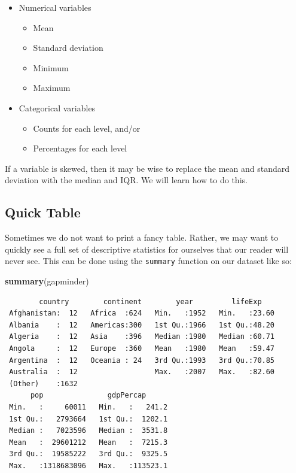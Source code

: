 \documentclass[
]{book}
\makeatletter
\newenvironment{Shaded}{\begin{snugshade}}{\end{snugshade}}
\newcommand{\FunctionTok}[1]{\textcolor[rgb]{0.27,0.27,0.27}{\textbf{#1}}}
\newcommand{\NormalTok}[1]{#1}
\providecommand{\tightlist}{%
  \setlength{\itemsep}{0pt}\setlength{\parskip}{0pt}}
\newenvironment{kframe}{%
\medskip{}
\setlength{\fboxsep}{.8em}
 \def\at@end@of@kframe{}%
 \ifinner\ifhmode%
  \def\at@end@of@kframe{\end{minipage}}%
  \begin{minipage}{\columnwidth}%
 \fi\fi%
 \def\FrameCommand##1{\hskip\@totalleftmargin \hskip-\fboxsep
 \colorbox{shadecolor}{##1}\hskip-\fboxsep
     \hskip-\linewidth \hskip-\@totalleftmargin \hskip\columnwidth}%
 \MakeFramed {\advance\hsize-\width
   \@totalleftmargin\z@ \linewidth\hsize
   \@setminipage}}%
 {\par\unskip\endMakeFramed%
 \at@end@of@kframe}
\renewenvironment{Shaded}{\begin{kframe}}{\end{kframe}}
\makeatother
\begin{document}
\begin{itemize}
\tightlist
\item
  Numerical variables

  \begin{itemize}
  \tightlist
  \item
    Mean
  \item
    Standard deviation
  \item
    Minimum
  \item
    Maximum
  \end{itemize}
\item
  Categorical variables

  \begin{itemize}
  \tightlist
  \item
    Counts for each level, and/or
  \item
    Percentages for each level
  \end{itemize}
\end{itemize}

If a variable is skewed, then it may be wise to replace the mean and standard deviation with the median and IQR. We will learn how to do this.

\hypertarget{quick-table}{%
\subsection{Quick Table}\label{quick-table}}

Sometimes we do not want to print a fancy table. Rather, we may want to quickly see a full set of descriptive statistics for ourselves that our reader will never see. This can be done using the \texttt{summary} function on our dataset like so:

\begin{Shaded}
\begin{Highlighting}[]
\FunctionTok{summary}\NormalTok{(gapminder)}
\end{Highlighting}
\end{Shaded}

\begin{verbatim}
        country        continent        year         lifeExp     
 Afghanistan:  12   Africa  :624   Min.   :1952   Min.   :23.60  
 Albania    :  12   Americas:300   1st Qu.:1966   1st Qu.:48.20  
 Algeria    :  12   Asia    :396   Median :1980   Median :60.71  
 Angola     :  12   Europe  :360   Mean   :1980   Mean   :59.47  
 Argentina  :  12   Oceania : 24   3rd Qu.:1993   3rd Qu.:70.85  
 Australia  :  12                  Max.   :2007   Max.   :82.60  
 (Other)    :1632                                                
      pop               gdpPercap       
 Min.   :     60011   Min.   :   241.2  
 1st Qu.:   2793664   1st Qu.:  1202.1  
 Median :   7023596   Median :  3531.8  
 Mean   :  29601212   Mean   :  7215.3  
 3rd Qu.:  19585222   3rd Qu.:  9325.5  
 Max.   :1318683096   Max.   :113523.1  
                                        
\end{verbatim}
\end{document}
